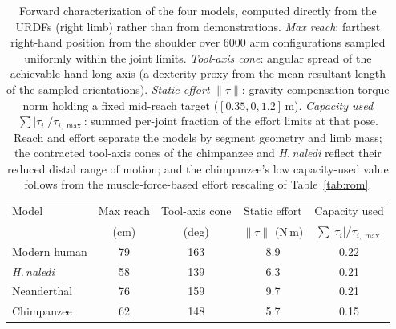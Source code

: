   \begin{table}[h]
  \centering
  \caption{Forward characterization of the four models, computed
  directly from the URDFs (right limb) rather than from demonstrations.
  \emph{Max reach}: farthest right-hand position from the shoulder over $6000$
  arm configurations sampled uniformly within the joint limits. \emph{Tool-axis
  cone}: angular spread of the achievable hand long-axis (a dexterity proxy from
  the mean resultant length of the sampled orientations). \emph{Static effort}
  $\lVert\tau\rVert$: gravity-compensation torque norm holding a fixed
  mid-reach target ($[0.35,0,1.2]$\,m). \emph{Capacity used}
  $\sum|\tau_i|/\tau_{i,\max}$: summed per-joint fraction of the effort limits at
  that pose. Reach and effort separate the models by segment geometry and limb
  mass; the contracted tool-axis cones of the chimpanzee and \textit{H.\,naledi}
  reflect their reduced distal range of motion; and the chimpanzee's low
  capacity-used value follows from the muscle-force-based effort rescaling of
  Table~\ref{tab:rom}.}
  \label{tab:capabilities}
  \small
  \begin{tabular}{@{}lcccc@{}}
  \toprule
  Model & Max reach & Tool-axis cone & Static effort & Capacity used \\
        & (cm)      & (deg)          & $\lVert\tau\rVert$ (N\,m) & $\sum|\tau_i|/\tau_{i,\max}$ \\
  \midrule
  Modern human        & 79 & 163 & 8.9 & 0.22 \\
  \textit{H.\,naledi} & 58 & 139 & 6.3 & 0.21 \\
  Neanderthal         & 76 & 159 & 9.7 & 0.21 \\
  Chimpanzee          & 62 & 148 & 5.7 & 0.15 \\
  \bottomrule
  \end{tabular}
  \end{table}


